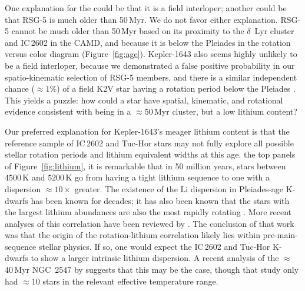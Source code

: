 \documentclass[12pt,twocolumn,tighten,linenumbers]{aastex63}
\begin{document}
One explanation for the  could be that it is a field
interloper; another could be that RSG-5 is much older than 50\,Myr.  We do
not favor either explanation.  
RSG-5 cannot be much older than 50\,Myr
based on its proximity to the $\delta$~Lyr cluster and IC\,2602 in the
CAMD, and because it is below the Pleiades in the 
rotation versus color diagram (Figure~\ref{fig:age}).
Kepler-1643 also seems highly unlikely to be a field interloper, 
because we demonstrated a  false positive probability
in our spatio-kinematic selection of RSG-5 members, and there is a 
similar independent chance
($\approx$$1\%$) of a field K2V star having a rotation period below the
Pleiades \citep{mcquillan_rotation_2014}.
This yields a puzzle: how could a star have spatial, kinematic, and rotational
evidence consistent with being in a $\approx$50\,Myr cluster,
but a low lithium content?

Our preferred explanation for Kepler-1643's meager lithium 
content is that the reference sample of IC\,2602 and Tuc-Hor
stars may not fully explore all possible stellar rotation
periods and lithium equivalent widths at this age.
the top panels of Figure~\ref{fig:lithium}, it is  remarkable that in
50 million years, stars between $4500$\,K and $5200$\,K go from
having a tight lithium sequence to one with a dispersion
$\approx10\times$ greater.  The existence of the Li dispersion in
Pleiades-age K-dwarfs has been known for decades; it has also been
known that the stars with the largest lithium abundances are also the
most rapidly rotating
\citep{butler_pleiades_1987,soderblom_evolution_1993}.  More recent
analyses of this correlation have been reviewed by
\citet{bouvier_lithium-rotation_2020}.  The conclusion of that work
was that the origin of the rotation-lithium correlation likely lies
within pre-main-sequence stellar physics.  If so, one would expect the
IC\,2602 and Tuc-Hor K-dwarfs to show a larger intrinsic lithium
dispersion.  A recent analysis of the $\approx$40\,Myr
NGC~2547 by \citet{binks_2022} suggests that this may
be the case, though that study only had $\approx$10 stars in the relevant
effective temperature range.
\end{document}
